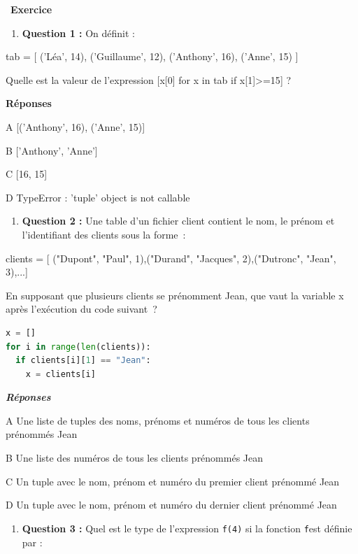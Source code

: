 \documentclass[
  11pt,
]{article}
\newcommand{\passthrough}[1]{#1}
\providecommand{\tightlist}{%
  \setlength{\itemsep}{0pt}\setlength{\parskip}{0pt}}
\newcounter{exo}
\newenvironment{exercice}[1]
{\par \medskip   \addtocounter{exo}{1} \noindent  
\begin{bclogo}[arrondi =0.1,   noborder = true, logo=\bccrayon, marge=4]{~\textbf{Exercice} \textbf{\theexo} {\itshape #1} }  \par}
{
\end{bclogo}
 \par \bigskip }
\newcounter{def}
\begin{document}
\begin{exercice}{}

\begin{enumerate}
\def\labelenumi{\arabic{enumi}.}
\tightlist
\item
  \textbf{Question 1 :} On définit :
\end{enumerate}

tab = {[} ('Léa', 14), ('Guillaume', 12), ('Anthony', 16), ('Anne', 15)
{]}

Quelle est la valeur de l'expression {[}x{[}0{]} for x in tab if
x{[}1{]}\textgreater=15{]} ?

\textbf{Réponses}

A {[}('Anthony', 16), ('Anne', 15){]}

B {[}'Anthony', 'Anne'{]}

C {[}16, 15{]}

D TypeError : 'tuple' object is not callable

\begin{enumerate}
\def\labelenumi{\arabic{enumi}.}
\setcounter{enumi}{1}
\tightlist
\item
  \textbf{Question 2 :} Une table d'un fichier client contient le nom,
  le prénom et l'identifiant des clients sous la forme~:
\end{enumerate}

clients = {[} ("Dupont", "Paul", 1),("Durand", "Jacques", 2),("Dutronc",
"Jean", 3),...{]}

En supposant que plusieurs clients se prénomment Jean, que vaut la
variable x après l'exécution du code suivant~?

\begin{lstlisting}[language=Python]
x = []
for i in range(len(clients)):
  if clients[i][1] == "Jean":
    x = clients[i]
\end{lstlisting}

\textbf{\emph{Réponses}}

A Une liste de tuples des noms, prénoms et numéros de tous les clients
prénommés Jean

B Une liste des numéros de tous les clients prénommés Jean

C Un tuple avec le nom, prénom et numéro du premier client prénommé Jean

D Un tuple avec le nom, prénom et numéro du dernier client prénommé Jean

\begin{enumerate}
\def\labelenumi{\arabic{enumi}.}
\setcounter{enumi}{2}
\tightlist
\item
  \textbf{Question 3 :} Quel est le type de l'expression
  \passthrough{\lstinline!f(4)!} si la fonction
  \passthrough{\lstinline!f!}est définie par :
\end{enumerate}


\end{exercice}
\end{document}
